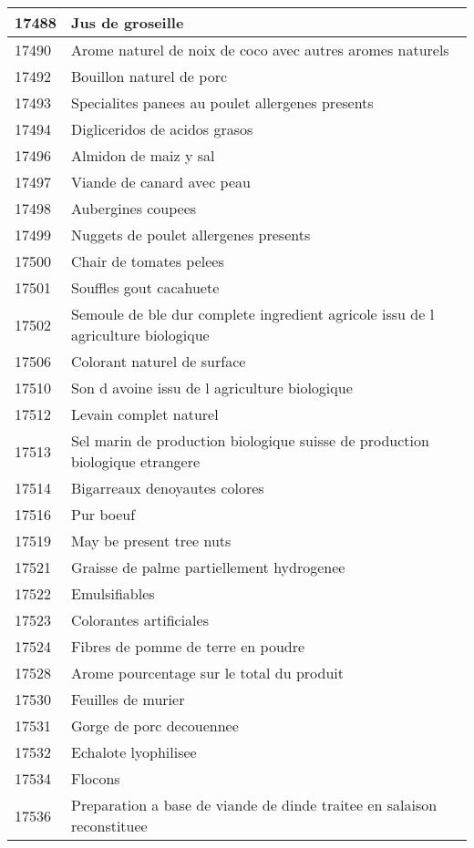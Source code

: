 \begin{longtable}{|l|l|}
17488 & Jus de groseille \\ \hline 
17490 & Arome naturel de noix de coco avec autres aromes naturels \\ \hline 
17492 & Bouillon naturel de porc \\ \hline 
17493 & Specialites panees au poulet allergenes presents \\ \hline 
17494 & Digliceridos de acidos grasos \\ \hline 
17496 & Almidon de maiz y sal \\ \hline 
17497 & Viande de canard avec peau \\ \hline 
17498 & Aubergines coupees \\ \hline 
17499 & Nuggets de poulet allergenes presents \\ \hline 
17500 & Chair de tomates pelees \\ \hline 
17501 & Souffles gout cacahuete \\ \hline 
17502 & Semoule de ble dur complete  ingredient agricole issu de l agriculture biologique \\ \hline 
17506 & Colorant naturel de surface \\ \hline 
17510 & Son d avoine issu de l agriculture biologique \\ \hline 
17512 & Levain complet naturel \\ \hline 
17513 & Sel marin de production biologique suisse de production biologique etrangere \\ \hline 
17514 & Bigarreaux denoyautes colores \\ \hline 
17516 & Pur boeuf \\ \hline 
17519 & May be present tree nuts \\ \hline 
17521 & Graisse de palme partiellement hydrogenee \\ \hline 
17522 & Emulsifiables \\ \hline 
17523 & Colorantes artificiales \\ \hline 
17524 & Fibres de pomme de terre en poudre \\ \hline 
17528 & Arome  pourcentage sur le total du produit \\ \hline 
17530 & Feuilles de murier \\ \hline 
17531 & Gorge de porc decouennee \\ \hline 
17532 & Echalote lyophilisee \\ \hline 
17534 & Flocons \\ \hline 
17536 & Preparation a base de viande de dinde traitee en salaison reconstituee \\ \hline 

\end{longtable}

